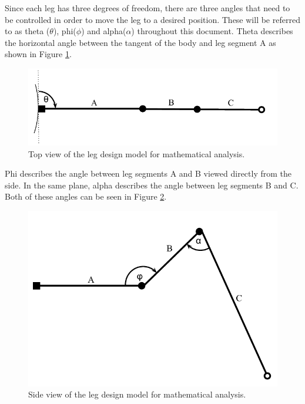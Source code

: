 \label{sec:theory}
Since each leg has three degrees of freedom, there are three angles that need to be controlled in order to move the leg to a desired position. These will be referred to as theta ($\theta$), phi($\phi$) and alpha($\alpha$) throughout this document. Theta describes the horizontal angle between the tangent of the body and leg segment A as shown in Figure \ref{fig:Leg_design_2}. 

\FloatBarrier
\begin{figure}[h]
\centering
\includegraphics[scale = 1]{pics/Leg_design_2.pdf}
\caption{Top view of the leg design model for mathematical analysis.}
\label{fig:Leg_design_2}
\end{figure}
\FloatBarrier

Phi describes the angle between leg segments A and B viewed directly from the side. In the same plane, alpha describes the angle between leg segments B and C. Both of these angles can be seen in Figure \ref{fig:Leg_design}.

\FloatBarrier
\begin{figure}[h]
\centering
\includegraphics[scale = 1]{pics/Leg_design.pdf}
\caption{Side view of the leg design model for mathematical analysis.}
\label{fig:Leg_design}
\end{figure}
\FloatBarrier

